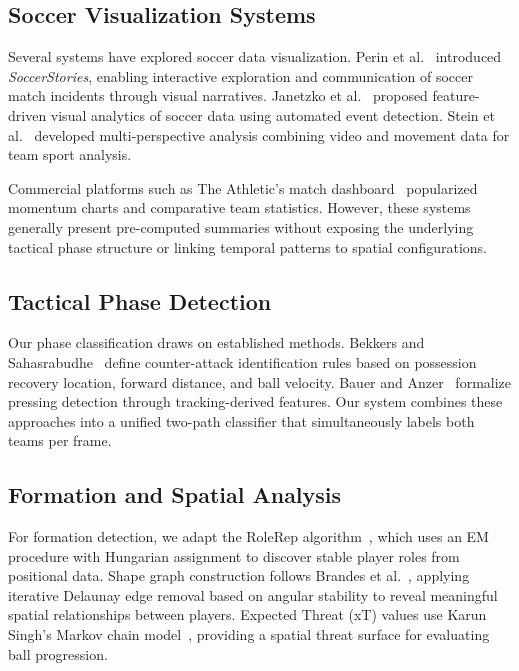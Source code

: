 \documentclass{vgtc}                          %
\begin{document}
\subsection{Soccer Visualization Systems}

Several systems have explored soccer data visualization. Perin et al.~\cite{perin2013} introduced \emph{SoccerStories}, enabling interactive exploration and communication of soccer match incidents through visual narratives. Janetzko et al.~\cite{janetzko2014} proposed feature-driven visual analytics of soccer data using automated event detection. Stein et al.~\cite{stein2018} developed multi-perspective analysis combining video and movement data for team sport analysis.

Commercial platforms such as The Athletic's match dashboard~\cite{athletic2023} popularized momentum charts and comparative team statistics. However, these systems generally present pre-computed summaries without exposing the underlying tactical phase structure or linking temporal patterns to spatial configurations.

\subsection{Tactical Phase Detection}

Our phase classification draws on established methods. Bekkers and Sahasrabudhe~\cite{bekkers2023} define counter-attack identification rules based on possession recovery location, forward distance, and ball velocity. Bauer and Anzer~\cite{bauer2021} formalize pressing detection through tracking-derived features. Our system combines these approaches into a unified two-path classifier that simultaneously labels both teams per frame.

\subsection{Formation and Spatial Analysis}

For formation detection, we adapt the RoleRep algorithm~\cite{bialkowski2014}, which uses an EM procedure with Hungarian assignment to discover stable player roles from positional data. Shape graph construction follows Brandes et al.~\cite{brandes2025}, applying iterative Delaunay edge removal based on angular stability to reveal meaningful spatial relationships between players. Expected Threat (xT) values use Karun Singh's Markov chain model~\cite{singh2019}, providing a spatial threat surface for evaluating ball progression.
\end{document}
